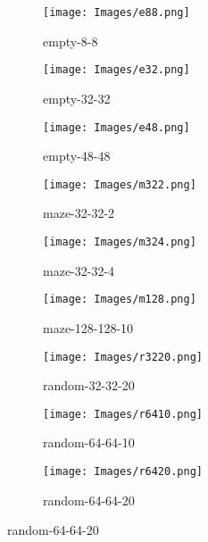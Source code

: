 \begin{figure}[htbp]
    \centering
    \begin{subfigure}[b]{0.3\textwidth}
        \texttt{[image: Images/e88.png]}
        \caption{empty-8-8}
        \label{fig:empty-8-8}
    \end{subfigure}
    \hspace{0.01\textwidth}
    \begin{subfigure}[b]{0.3\textwidth}
        \texttt{[image: Images/e32.png]}
        \caption{empty-32-32}
        \label{fig:empty-32-32}
    \end{subfigure}
    \hspace{0.01\textwidth}
    \begin{subfigure}[b]{0.3\textwidth}
        \texttt{[image: Images/e48.png]}
        \caption{empty-48-48}
        \label{fig:empty-48-48}
    \end{subfigure}

    \vspace{0.5cm}

    \begin{subfigure}[b]{0.3\textwidth}
        \texttt{[image: Images/m322.png]}
        \caption{maze-32-32-2}
        \label{fig:maze-32-32-2-}
    \end{subfigure}
    \hspace{0.01\textwidth}
    \begin{subfigure}[b]{0.3\textwidth}
        \texttt{[image: Images/m324.png]}
        \caption{maze-32-32-4}
        \label{fig:maze-32-32-4}
    \end{subfigure}
    \hspace{0.01\textwidth}
    \begin{subfigure}[b]{0.3\textwidth}
        \texttt{[image: Images/m128.png]}
        \caption{maze-128-128-10}
        \label{fig:maze-128-128-10}
    \end{subfigure}

    \vspace{0.5cm}

    \begin{subfigure}[b]{0.3\textwidth}
        \texttt{[image: Images/r3220.png]}
        \caption{random-32-32-20}
        \label{fig:random-32-32-20}
    \end{subfigure}
    \hspace{0.01\textwidth}
    \begin{subfigure}[b]{0.3\textwidth}
        \texttt{[image: Images/r6410.png]}
        \caption{random-64-64-10}
        \label{fig:random-64-64-10}
    \end{subfigure}
    \hspace{0.01\textwidth}
    \begin{subfigure}[b]{0.3\textwidth}
        \texttt{[image: Images/r6420.png]}
        \caption{random-64-64-20}
        \label{fig:random-64-64-20}
    \end{subfigure}


\end{figure}
